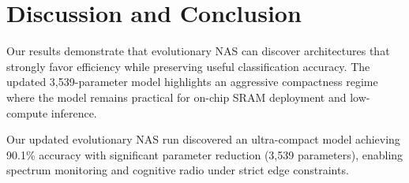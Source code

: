 \documentclass[conference]{IEEEtran}
\begin{document}
\section{Discussion and Conclusion}

Our results demonstrate that evolutionary NAS can discover architectures that strongly favor efficiency while preserving useful classification accuracy. The updated 3,539-parameter model highlights an aggressive compactness regime where the model remains practical for on-chip SRAM deployment and low-compute inference.


Our updated evolutionary NAS run discovered an ultra-compact model achieving 90.1\% accuracy with significant parameter reduction (3,539 parameters), enabling spectrum monitoring and cognitive radio under strict edge constraints.



\end{document}
